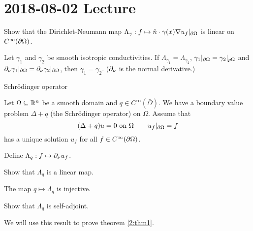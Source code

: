 \section{2018-08-02 Lecture}

\begin{exer}
Show that the Dirichlet-Neumann map $\Lambda_\gamma: f \mapsto \hat n \cdot \gamma(x) \nabla u_f|_{\partial\Omega}$ is linear on $C^\infty(\partial\Omega)$.
\end{exer}

\begin{thm}\label{2:thm1}
  Let $\gamma_1$ and $\gamma_2$ be smooth isotropic conductivities.
  If $\Lambda_{\gamma_1}=\Lambda_{\gamma_2}$, $\gamma_1|_{\partial\Omega}=\gamma_2|_{p\Omega}$ and $\partial_\nu\gamma_1|_{\partial\Omega}=\partial_\nu\gamma_2|_{\partial\Omega}$, then $\gamma_1=\gamma_2$.
  ($\partial_\nu$ is the normal derivative.)
\end{thm}

Schr\"odinger operator

\begin{defn}
  Let $\Omega \subseteq \mathbb{R}^n$ be a smooth domain and $q \in C^\infty(\bar\Omega)$.
  We have a boundary value problem $\Delta+q$ (the Schr\"odinger operator) on $\Omega$.
  Assume that
  \[ (\Delta+q)u=0 \text{ on } \Omega \qquad u_f|_{\partial\Omega}=f \]
  has a unique solution $u_f$ for all $f \in C^\infty(\partial\Omega)$.
  
  Define $\Lambda_q: f \mapsto \partial_\nu u_f$.
\end{defn}

\begin{exer}
  Show that $\Lambda_q$ is a linear map.
\end{exer}

\begin{thm}\label{2:thm2}
  The map $q \mapsto \Lambda_q$ is injective.
\end{thm}

\begin{exer}
  Show that $\Lambda_q$ is self-adjoint.
\end{exer}

We will use this result to prove theorem \ref{2:thm1}.

